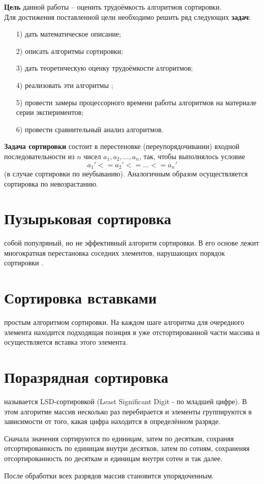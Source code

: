 \textbf{Цель} данной работы – оценить трудоёмкость алгоритмов сортировки.\\

Для достижения поставленной цели необходимо решить ряд следующих \textbf{задач}:
\begin{enumerate}
\item[1)] дать математическое описание;
\item[2)] описать алгоритмы сортировки;
\item[3)] дать теоретическую оценку трудоёмкости алгоритмов;
\item[4)] реализовать эти алгоритмы ;
\item[5)] провести замеры процессорного времени работы алгоритмов на материале серии экспериментов;
\item[6)] провести сравнительный анализ алгоритмов.
\end{enumerate}

\textbf{Задача сортировки} состоит в перестеновке (переупорядочивании) входной последовательности из $n$ чисел ${a_1, a_2, ..., a_n}$, так, чтобы выполнялось условие
\begin{equation}
	a_1' <= a_2' <= ... <= a_n'
\end{equation} (в случае сортировки по неубыванию). Аналогичным образом осуществляется сортировка по невозрастанию.

\section{Пузырьковая сортировка}
 собой популряный, но не эффективный алгоритм сортировки. В его основе лежит многократная перестановка соседних элементов, нарушающих порядок сортировки \cite{Kormen}.

\section{Сортировка вставками}
 простым алгоритмом сортировки. На каждом шаге алгоритма для очередного элемента находится подходящая позиция в уже отстортированной части массива и осуществляется вставка этого элемента. 

\section{Поразрядная сортировка}
 называется LSD-сортировкой (Least Significant Digit - по младшей цифре). В этом алгоритме массив несколько раз перебирается и элементы группируются в зависимости от того, какая цифра находится в определённом разряде. 

Сначала значения сортируются по единицам, затем по десяткам, сохраняя отсортированность по единицам внутри десятков, затем по сотням, сохраненяя отсортированность по десяткам и единицам внутри сотен и так далее.

После обработки всех разрядов массив становится упорядоченным.  